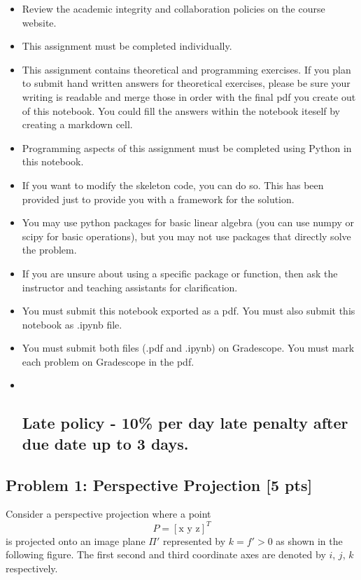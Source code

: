 \documentclass[11pt]{article}
\begin{document}
\begin{itemize}
\item
  Review the academic integrity and collaboration policies on the course
  website.
\item
  This assignment must be completed individually.
\item
  This assignment contains theoretical and programming exercises. If you
  plan to submit hand written answers for theoretical exercises, please
  be sure your writing is readable and merge those in order with the
  final pdf you create out of this notebook. You could fill the answers
  within the notebook iteself by creating a markdown cell.
\item
  Programming aspects of this assignment must be completed using Python
  in this notebook.
\item
  If you want to modify the skeleton code, you can do so. This has been
  provided just to provide you with a framework for the solution.
\item
  You may use python packages for basic linear algebra (you can use
  numpy or scipy for basic operations), but you may not use packages
  that directly solve the problem.
\item
  If you are unsure about using a specific package or function, then ask
  the instructor and teaching assistants for clarification.
\item
  You must submit this notebook exported as a pdf. You must also submit
  this notebook as .ipynb file.
\item
  You must submit both files (.pdf and .ipynb) on Gradescope. You must
  mark each problem on Gradescope in the pdf.
\item ~
  \subsection{\texorpdfstring{\textbf{Late policy} - 10\% per day late
  penalty after due date up to 3
  days.}{Late policy - 10\% per day late penalty after due date up to 3 days.}}\label{late-policy---10-per-day-late-penalty-after-due-date-up-to-3-days.}
\end{itemize}

    \subsection{Problem 1: Perspective Projection {[}5
pts{]}}\label{problem-1-perspective-projection-5-pts}

Consider a perspective projection where a point \[
P = [\text{x y z}]^T
\] is projected onto an image plane \(\Pi'\) represented by \(k = f'>0\)
as shown in the following figure. The first second and third coordinate
axes are denoted by \(i\), \(j\), \(k\) respectively.
\end{document}
